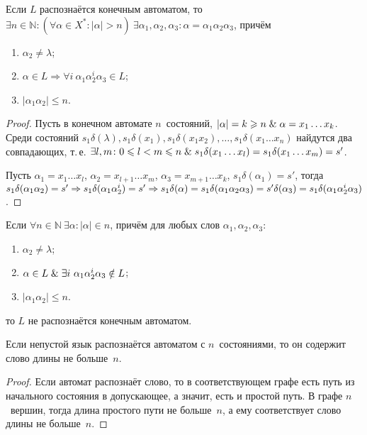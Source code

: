 \begin{lemma}[о накачке]
Если $L$ распознаётся конечным автоматом, то $\exists n \in \mathbb N \colon (\forall \alpha \in X^* \colon |\alpha| > n) \ \allowbreak \exists \alpha_1, \alpha_2, \alpha_3 \colon \alpha = \alpha_1 \alpha_2 \alpha_3$, причём
\begin{enumerate}	
	\item $\alpha_2 \neq \lambda$;
	\item $\alpha \in L \Rightarrow \forall i \ \alpha_1 \alpha_2^i \alpha_3 \in L$;
	\item $|\alpha_1 \alpha_2| \leqslant n$.
\end{enumerate}
\end{lemma}
\begin{proof}
Пусть в конечном автомате $n$~состояний, $|\alpha| = k \geqslant n \mathrel{\&} \alpha = x_1 \ldots x_k$.
Среди состояний $s_1 \delta(\lambda), s_1 \delta(x_1), s_1 \delta(x_1 x_2), \ldots, s_1 \delta(x_1 \ldots x_n)$ найдутся два совпадающих, т.\,е.
$\exists l, m \colon 0 \leqslant l < m \leqslant n \lAnd s_1 \delta(x_1 \ldots x_l) \opbr= s_1 \delta(x_1 \ldots x_m) \opbr= s'$.

Пусть $\alpha_1 = x_1 \ldots x_l$, $\alpha_2 = x_{l+1} \ldots x_m$, $\alpha_3 = x_{m+1} \ldots x_k$, $s_1 \delta(\alpha_1) = s'$, тогда $s_1 \delta(\alpha_1 \alpha_2) = s' \opbr\Rightarrow s_1 \delta(\alpha_1 \alpha_2^i) = s' \opbr\Rightarrow s_1 \delta(\alpha) = s_1 \delta(\alpha_1 \alpha_2 \alpha_3) = s' \delta(\alpha_3) = s_1 \delta(\alpha_1 \alpha_2^i \alpha_3)$.
\end{proof}

\begin{consequent}
Если $\forall n \in \mathbb N \ \exists \alpha \colon |\alpha| \in n$, причём для любых слов $\alpha_1, \alpha_2, \alpha_3$:
\begin{enumerate}
	\item $\alpha_2 \neq \lambda$;
	\item $\alpha \in L \lAnd \exists i \ \alpha_1 \alpha_2^i \alpha_3 \notin L$;
	\item $|\alpha_1 \alpha_2| \leqslant n$.
\end{enumerate}
то $L$ не распознаётся конечным автоматом.
\end{consequent}

\begin{statement}
Если непустой язык распознаётся автоматом с $n$~состояниями, то он содержит слово длины не больше~$n$.
\end{statement}
\begin{proof}
Если автомат распознаёт слово, то в соответствующем графе есть путь из начального состояния в допускающее, а значит, есть и простой путь.
В графе $n$~вершин, тогда длина простого пути не больше~$n$, а ему соответствует слово длины не больше~$n$.
\end{proof}